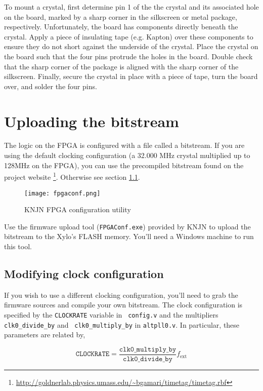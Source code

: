 To mount a crystal, first determine pin 1 of the the crystal and its
associated hole on the board, marked by a sharp corner in the
silkscreen or metal package, respectively. Unfortunately, the board
has components directly beneath the crystal. Apply a piece of
insulating tape (e.g. Kapton) over these components to ensure they do
not short against the underside of the crystal. Place the crystal on
the board such that the four pins protrude the holes in the
board. Double check that the sharp corner of the package is aligned
with the sharp corner of the silkscreen. Finally, secure the crystal
in place with a piece of tape, turn the board over, and solder the
four pins.

\section{Uploading the bitstream}
\label{Sec:UploadingBitstream}

The logic on the FPGA is configured with a file called a bitstream.
If you are using the default clocking configuration (a 32.000 MHz
crystal multiplied up to 128MHz on the FPGA), you can use the 
precompiled bitstream found on the project website
\footnote{\url{http://goldnerlab.physics.umass.edu/~bgamari/timetag/timetag.rbf}}.
Otherwise see section \ref{Sec:ModifyingClock}.

\begin{figure}
  \center
  \texttt{[image: fpgaconf.png]}
  \caption{KNJN FPGA configuration utility}
  \label{fig:fpgaconf}
\end{figure}

Use the firmware upload tool ({\tt FPGAConf.exe}) provided by KNJN to
upload the bitstream to the Xylo's FLASH memory. You'll need a Windows
machine to run this tool.

\subsection{Modifying clock configuration}
\label{Sec:ModifyingClock}
If you wish to use a different clocking configuration, you'll need to
grab the firmware sources and compile your own bitstream. The clock
configuration is specified by the {\tt CLOCKRATE} variable in {\tt
config.v} and the multipliers {\tt clk0\_divide\_by} and {\tt
clk0\_multiply\_by} in {\tt altpll0.v}. In particular, these parameters
are related by,

\[ \mathtt{CLOCKRATE} = \frac{\mathtt{clk0\_multiply\_by}}{\mathtt{clk0\_divide\_by}} f_\mathrm{ext} \]

